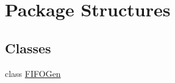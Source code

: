 \hypertarget{namespace_structures}{}\section{Package Structures}
\label{namespace_structures}
\subsection*{Classes}
\begin{DoxyCompactItemize}
\item 
class \hyperlink{class_structures_1_1_f_i_f_o_gen}{F\+I\+F\+O\+Gen}
\end{DoxyCompactItemize}
